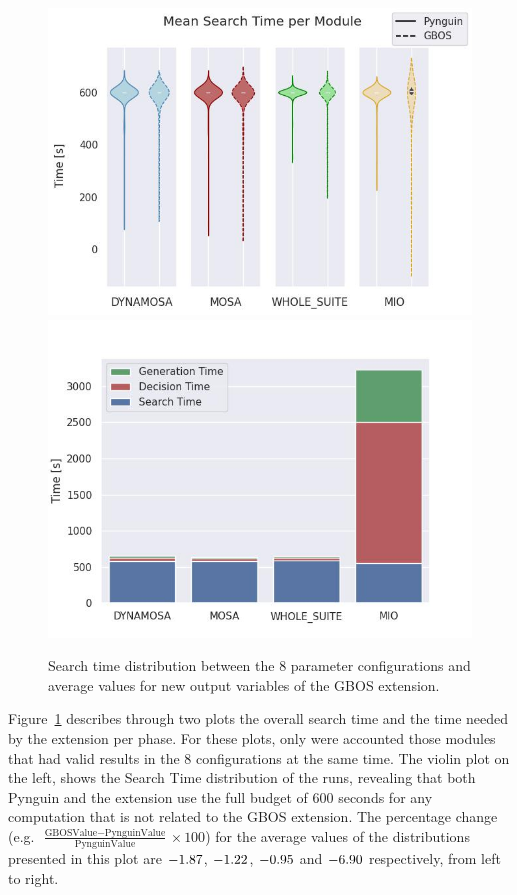 \documentclass[%
  chapterprefix=false,%
  open=right,%
  twoside=true,%
  paper=a4,%
  logofile={Figures/logo.png},%
  thesistype=master,%
  UKenglish,%
]{se2thesis}
\begin{document}
\begin{figure}[b]
    \includegraphics[width=\linewidth]{Figures/Results/SearchTime.jpg}
  \endminipage\hfill
    \includegraphics[width=\linewidth]{Figures/Results/timeDist.jpg}
  \endminipage\@
  \caption{Search time distribution between the 8 parameter configurations and average values for new output variables of the GBOS extension.}\label{fig:times}
\end{figure}

Figure~\ref{fig:times} describes through two plots the overall search time and the time needed by the extension per phase.
For these plots, only were accounted those modules that had valid results in the 8 configurations at the same time.
The violin plot on the left, shows the Search Time distribution of the runs, revealing that both Pynguin and the extension use the full budget of 600 seconds for any computation that is not related to the GBOS extension.
The percentage change (e.g.~\(\frac{\text{GBOSValue} - \text{PynguinValue}}{\text{PynguinValue}}\times 100\)) for the average values of the distributions presented in this plot are \(-1.87\), \(-1.22\), \(-0.95\) and \(-6.90\) respectively, from left to right.
\end{document}
